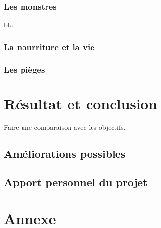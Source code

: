 \documentclass[12pt]{report}
\begin{document}
		\subsection{Les monstres}
		
		bla
		
		\subsection{La nourriture et la vie}
		
		\subsection{Les pièges}

\chapter{Résultat et conclusion}

	Faire une comparaison avec les objectifs.
	
	\section{Améliorations possibles}
	
	\section{Apport personnel du projet}

\chapter{Annexe}
\end{document}
